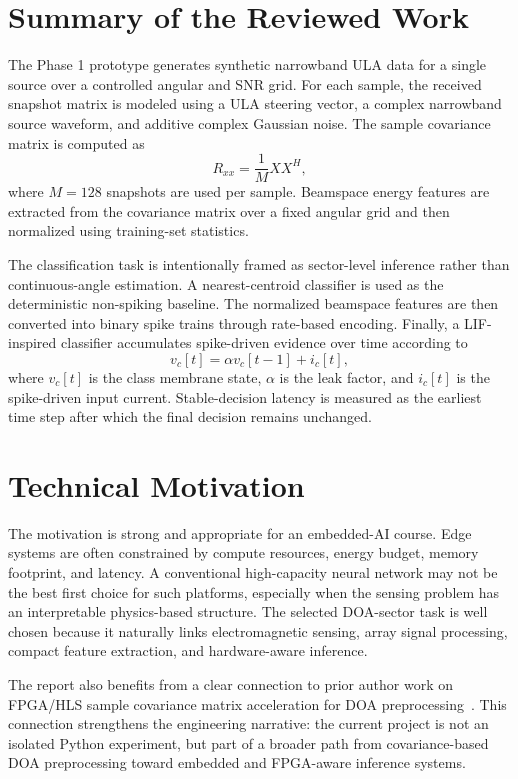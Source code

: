\documentclass[11pt]{article}
\begin{document}
\section{Summary of the Reviewed Work}

The Phase 1 prototype generates synthetic narrowband ULA data for a single source over a controlled angular and SNR grid. For each sample, the received snapshot matrix is modeled using a ULA steering vector, a complex narrowband source waveform, and additive complex Gaussian noise. The sample covariance matrix is computed as
\begin{equation}
    R_{xx}=\frac{1}{M}XX^{H},
\end{equation}
where $M=128$ snapshots are used per sample. Beamspace energy features are extracted from the covariance matrix over a fixed angular grid and then normalized using training-set statistics.

The classification task is intentionally framed as sector-level inference rather than continuous-angle estimation. A nearest-centroid classifier is used as the deterministic non-spiking baseline. The normalized beamspace features are then converted into binary spike trains through rate-based encoding. Finally, a LIF-inspired classifier accumulates spike-driven evidence over time according to
\begin{equation}
    v_c[t]=\alpha v_c[t-1]+i_c[t],
\end{equation}
where $v_c[t]$ is the class membrane state, $\alpha$ is the leak factor, and $i_c[t]$ is the spike-driven input current. Stable-decision latency is measured as the earliest time step after which the final decision remains unchanged.

\section{Technical Motivation}

The motivation is strong and appropriate for an embedded-AI course. Edge systems are often constrained by compute resources, energy budget, memory footprint, and latency. A conventional high-capacity neural network may not be the best first choice for such platforms, especially when the sensing problem has an interpretable physics-based structure. The selected DOA-sector task is well chosen because it naturally links electromagnetic sensing, array signal processing, compact feature extraction, and hardware-aware inference.

The report also benefits from a clear connection to prior author work on FPGA/HLS sample covariance matrix acceleration for DOA preprocessing~\cite{molhem2026scmhls}. This connection strengthens the engineering narrative: the current project is not an isolated Python experiment, but part of a broader path from covariance-based DOA preprocessing toward embedded and FPGA-aware inference systems.
\end{document}
